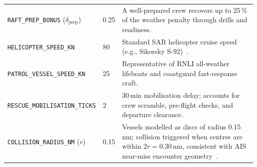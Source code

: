 \documentclass[cameraready]{Interspeech}
\begin{document}
\begin{table}[htbp]
\begin{tabularx}{16cm}{@{}llX@{}}
        \texttt{RAFT\_PREP\_BONUS} ($\delta_\text{prep}$) & 0.25 & A well-prepared crew recovers up to 25\,\% of the weather penalty through drills and readiness. \\
        \texttt{HELICOPTER\_SPEED\_KN} & 80 & Standard SAR helicopter cruise speed (e.g., Sikorsky S-92)~\cite{imosar2018}. \\
        \texttt{PATROL\_VESSEL\_SPEED\_KN} & 25 & Representative of RNLI all-weather lifeboats and coastguard fast-response craft. \\
        \texttt{RESCUE\_MOBILISATION\_TICKS} & 2 & 30\,min mobilisation delay; accounts for crew scramble, pre-flight checks, and departure clearance. \\
        \texttt{COLLISION\_RADIUS\_NM} ($r$) & 0.15 & Vessels modelled as discs of radius 0.15\,nm; collision triggered when centres are within $2r{=}0.30$\,nm, consistent with AIS near-miss encounter geometry~\cite{zhang2015}. \\
        \bottomrule
    \end{tabularx}
\end{table}
\end{document}
